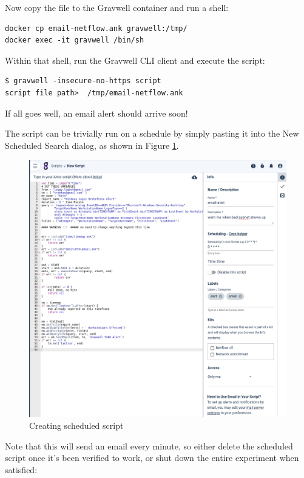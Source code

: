 Now copy the file to the Gravwell container and run a shell:

\begin{Verbatim}[breaklines=true]
docker cp email-netflow.ank gravwell:/tmp/
docker exec -it gravwell /bin/sh
\end{Verbatim}

Within that shell, run the Gravwell CLI client and execute the script:

\begin{Verbatim}[breaklines=true]
$ gravwell -insecure-no-https script
script file path>  /tmp/email-netflow.ank
\end{Verbatim}

If all goes well, an email alert should arrive soon!

The script can be trivially run on a schedule by simply pasting it into
the New Scheduled Search dialog, as shown in Figure \ref{fig:lab-create-script}.

\begin{figure}
	\includegraphics{images/lab-create-script.png}
	\caption{Creating scheduled script}
	\label{fig:lab-create-script}
\end{figure}

Note that this will send an email every minute, so either delete the
scheduled script once it's been verified to work, or shut down the
entire experiment when satisfied:


